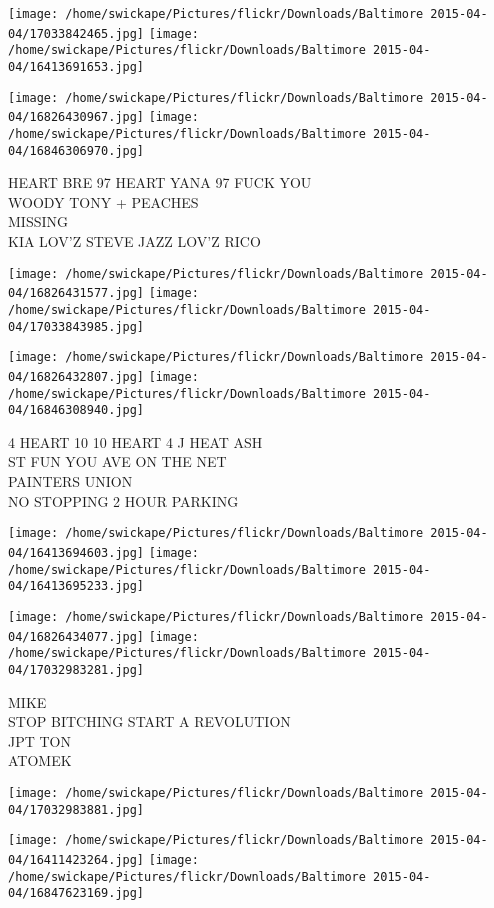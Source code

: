 \documentclass[10pt,letterpaper]{article}
\begin{document}
\texttt{[image: /home/swickape/Pictures/flickr/Downloads/Baltimore 2015-04-04/17033842465.jpg]}
\texttt{[image: /home/swickape/Pictures/flickr/Downloads/Baltimore 2015-04-04/16413691653.jpg]}

\texttt{[image: /home/swickape/Pictures/flickr/Downloads/Baltimore 2015-04-04/16826430967.jpg]}
\texttt{[image: /home/swickape/Pictures/flickr/Downloads/Baltimore 2015-04-04/16846306970.jpg]}

HEART BRE 97 HEART YANA 97 FUCK YOU\\
WOODY TONY + PEACHES\\
MISSING\\
KIA LOV'Z STEVE JAZZ LOV'Z RICO
\pagebreak

\texttt{[image: /home/swickape/Pictures/flickr/Downloads/Baltimore 2015-04-04/16826431577.jpg]}
\texttt{[image: /home/swickape/Pictures/flickr/Downloads/Baltimore 2015-04-04/17033843985.jpg]}

\texttt{[image: /home/swickape/Pictures/flickr/Downloads/Baltimore 2015-04-04/16826432807.jpg]}
\texttt{[image: /home/swickape/Pictures/flickr/Downloads/Baltimore 2015-04-04/16846308940.jpg]}

4 HEART 10 10 HEART 4 J HEAT ASH\\
ST FUN YOU AVE ON THE NET\\
PAINTERS UNION\\
NO STOPPING 2 HOUR PARKING
\pagebreak

\texttt{[image: /home/swickape/Pictures/flickr/Downloads/Baltimore 2015-04-04/16413694603.jpg]}
\texttt{[image: /home/swickape/Pictures/flickr/Downloads/Baltimore 2015-04-04/16413695233.jpg]}

\texttt{[image: /home/swickape/Pictures/flickr/Downloads/Baltimore 2015-04-04/16826434077.jpg]}
\texttt{[image: /home/swickape/Pictures/flickr/Downloads/Baltimore 2015-04-04/17032983281.jpg]}

MIKE\\
STOP BITCHING START A REVOLUTION\\
JPT TON\\
ATOMEK
\pagebreak

\texttt{[image: /home/swickape/Pictures/flickr/Downloads/Baltimore 2015-04-04/17032983881.jpg]}

\vspace{0.25in}
\texttt{[image: /home/swickape/Pictures/flickr/Downloads/Baltimore 2015-04-04/16411423264.jpg]}
\texttt{[image: /home/swickape/Pictures/flickr/Downloads/Baltimore 2015-04-04/16847623169.jpg]}
\end{document}
